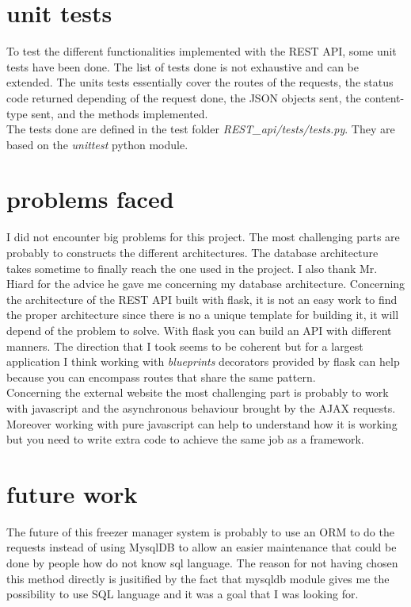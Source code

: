 \section{unit tests}
To test the different functionalities implemented with the REST API, some unit tests have been done. The list of tests done is not exhaustive and can be extended. The units tests essentially cover the routes of the requests, the status code returned depending of the request done, the JSON objects sent, the content-type sent, and the methods implemented.\\

The tests done are defined in the test folder \textit{REST\_api/tests/tests.py}. They are based on the \textit{unittest} python module.
\section{problems faced}
I did not encounter big problems for this project. The most challenging parts are probably to constructs the different architectures. The database architecture takes sometime to finally reach the one used in the project. I also thank Mr. Hiard for the advice he gave me concerning my database architecture. Concerning the architecture of the REST API built with flask, it is not an easy work to find the proper architecture since there is no a unique template for building it, it will depend of the problem to solve. With flask you can build an API with different manners. The direction that I took seems to be coherent but for a largest application I think working with \textit{blueprints} decorators provided by flask can help because you can encompass routes that share the same pattern.\\

Concerning the external website the most challenging part is probably to work with javascript and the asynchronous behaviour brought by the AJAX requests. Moreover working with pure javascript can help to understand how it is working but you need to write extra code to achieve the same job as a framework.
\section{future work}
The future of this freezer manager system is probably to use an ORM to do the requests instead of using MysqlDB to allow an easier maintenance that could be done by people how do not know sql language. The reason for not having chosen this method directly is jusitified by the fact that mysqldb module gives me the possibility to use SQL language and it was a goal that I was looking for.\\

